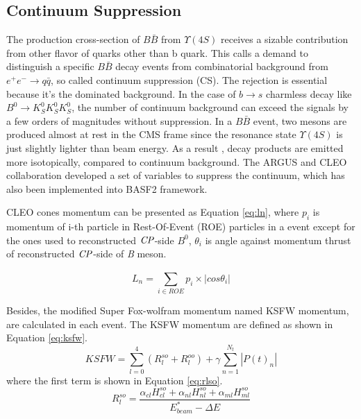 \subsection{Continuum Suppression}
The production cross-section of $B\bar{B}$ from $\Upsilon{(4S)}$ receives a sizable contribution from other flavor of quarks other than b quark. This calls a demand to distinguish a specific $B\bar{B}$ decay events from combinatorial background from $e^+e^- \to q\bar{q}$, so called continuum suppression (CS). The rejection is essential because it's the dominated background.  In the case of $b \to s$ charmless decay like $B^0 \to K_S^0  K_S^0  K_S^0$, the number of continuum background can exceed the signals by a few orders of magnitudes without suppression. In a $B\bar{B}$ event, two mesons are produced almost at rest in the CMS frame since the resonance state $\Upsilon(4S)$ is  just slightly lighter than beam energy. As a result	, decay products are emitted more isotopically, compared to continuum background. The ARGUS and CLEO collaboration\cite{Bevan_2014} developed a set of variables to suppress the continuum, which has also been implemented into BASF2 framework. 

CLEO cones momentum can be presented as Equation \ref{eq:ln}, where $ p_i $ is momentum of i-th particle in Rest-Of-Event (ROE) particles in a event except for the ones used to reconstructed $\it{CP}$-side $B^0$, $\theta_i$ is angle against momentum thrust of reconstructed $\it{CP}$-side of \textit{B} meson.

\begin{equation}\label{eq:ln}
L_n = \sum_{i\in ROE}^{} p_i \times |cos\theta_i|
\end{equation}

Besides, the modified Super Fox-wolfram momentum named  KSFW momentum, are calculated in each event. The KSFW momentum are defined as shown in Equation \ref{eq:ksfw}. 
\begin{equation}\label{eq:ksfw}
KSFW = \sum_{l=0}^{4}( R_l^{so} + R_l^{oo}) + \gamma \sum_{n=1}^{N_t}|P(t)_n|
\end{equation}
where the first term is shown in Equation \ref{eq:rlso}.
\begin{equation}\label{eq:rlso}
R_l^{so} = \frac{\alpha_{cl}H_{cl}^{so} +
				\alpha_{nl}H_{nl}^{so}+
			\alpha_{ml}H_{ml}^{so}}{E^*_{beam}-\Delta E}
\end{equation}

